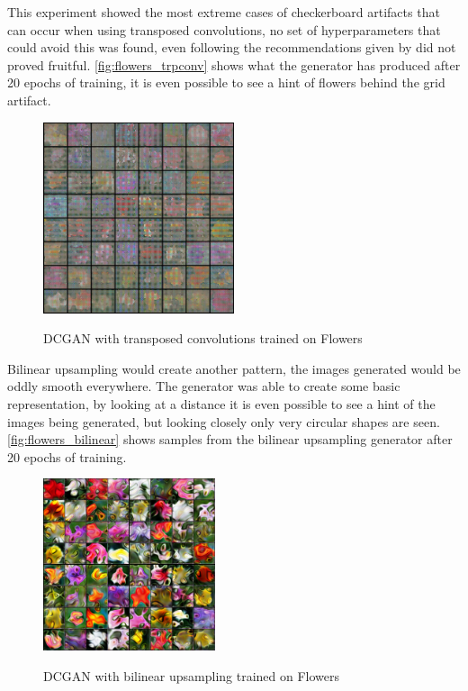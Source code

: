 This experiment showed the most extreme cases of checkerboard artifacts that can occur when using transposed convolutions, no set of hyperparameters that could avoid this was found, even following the recommendations given by \textcite{deconvolutionArtifacts2016} did not proved fruitful. \autoref{fig:flowers_trpconv} shows what the generator has produced after 20 epochs of training, it is even possible to see a hint of flowers behind the grid artifact. 
\begin{figure}[hbt]
    \centering
    \caption{DCGAN with transposed convolutions trained on Flowers}
    \includegraphics[width=0.5\textwidth]{chapters/Experiments/Other/flowers_trpconv.png}
    \label{fig:flowers_trpconv}
\end{figure}

Bilinear upsampling would create another pattern, the images generated would be oddly smooth everywhere. The generator was able to create some basic representation, by looking at a distance it is even possible to see a hint of the images being generated, but looking closely only very circular shapes are seen. \autoref{fig:flowers_bilinear} shows samples from the bilinear upsampling generator after 20 epochs of training.
\begin{figure}[hbt]
    \centering
    \caption{DCGAN with bilinear upsampling trained on Flowers}
    \includegraphics[width=0.45\textwidth]{chapters/Experiments/Other/flowers_bilinear.png}
    \label{fig:flowers_bilinear}
\end{figure}

